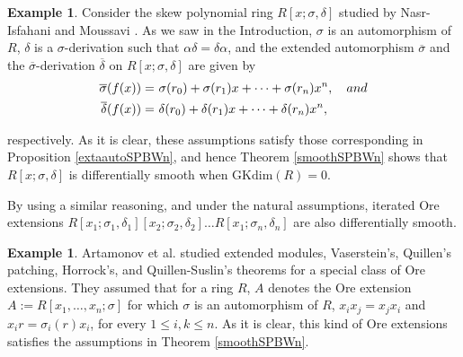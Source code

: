 \documentclass{amsart}
\theoremstyle{definition}
\newtheorem{example}[theorem]{Example}
\theoremstyle{remark}
\numberwithin{equation}{section}
\begin{document}
\begin{example}
Consider the skew polynomial ring $R[x; \sigma, \delta]$ studied by Nasr-Isfahani and Moussavi \cite{NasrMoussavi2008}. As we saw in the Introduction, $\sigma$ is an automorphism of $R$, $\delta$ is a $\sigma$-derivation such that $\alpha \delta = \delta \alpha$, and the extended automorphism $\overline{\sigma}$ and the $\overline{\sigma}$-derivation $\overline{\delta}$ on $R[x; \sigma, \delta]$ are given by
\begin{align*}
    \overline{\sigma}(f(x)) = &\ \sigma(r_0) + \sigma(r_1) x + \dotsb + \sigma(r_n)x^n, \quad {\rm and} \\
     \overline{\delta}(f(x)) = &\ \delta(r_0) + \delta(r_1) x + \dotsb + \delta(r_n)x^n, 
\end{align*}

respectively. As it is clear, these assumptions satisfy those corresponding in Proposition \ref{extaautoSPBWn}, and hence Theorem \ref{smoothSPBWn} shows that $R[x; \sigma, \delta]$ is differentially smooth when $\text{GKdim}(R)=0$.

By using a similar reasoning, and under the natural assumptions, iterated Ore extensions $R[x_1; \sigma_1, \delta_1][x_2;\sigma_2, \delta_2] \dotsc R[x_1; \sigma_n, \delta_n]$ are also differentially smooth.
\end{example}

\begin{example}
Artamonov et al. \cite{ArtamonovLezamaFajardo2016} studied extended modules, Vaserstein's, Quillen's patching, Horrock's, and Quillen-Suslin's theorems for a special class of Ore extensions. They assumed that for a ring $R$, $A$ denotes the Ore extension $A := R[x_1, \dotsc, x_n; \sigma]$ for which $\sigma$ is an automorphism of $R$, $x_i x_j = x_j x_i$ and $x_i r = \sigma_i(r) x_i$, for every $1\le i, k \le n$. As it is clear, this kind of Ore extensions satisfies the assumptions in Theorem \ref{smoothSPBWn}.
\end{example}
\end{document}
